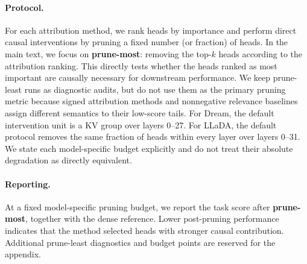 \paragraph{Protocol.}
For each attribution method, we rank heads by importance and perform direct causal interventions by pruning a fixed number (or fraction) of heads. In the main text, we focus on \textbf{prune-most}: removing the top-$k$ heads according to the attribution ranking. This directly tests whether the heads ranked as most important are causally necessary for downstream performance. We keep prune-least runs as diagnostic audits, but do not use them as the primary pruning metric because signed attribution methods and nonnegative relevance baselines assign different semantics to their low-score tails.
For Dream, the default intervention unit is a KV group over layers 0--27. For LLaDA, the default protocol removes the same fraction of heads within every layer over layers 0--31. We state each model-specific budget explicitly and do not treat their absolute degradation as directly equivalent.

\paragraph{Reporting.}
At a fixed model-specific pruning budget, we report the task score after \textbf{prune-most}, together with the dense reference. Lower post-pruning performance indicates that the method selected heads with stronger causal contribution. Additional prune-least diagnostics and budget points are reserved for the appendix.

